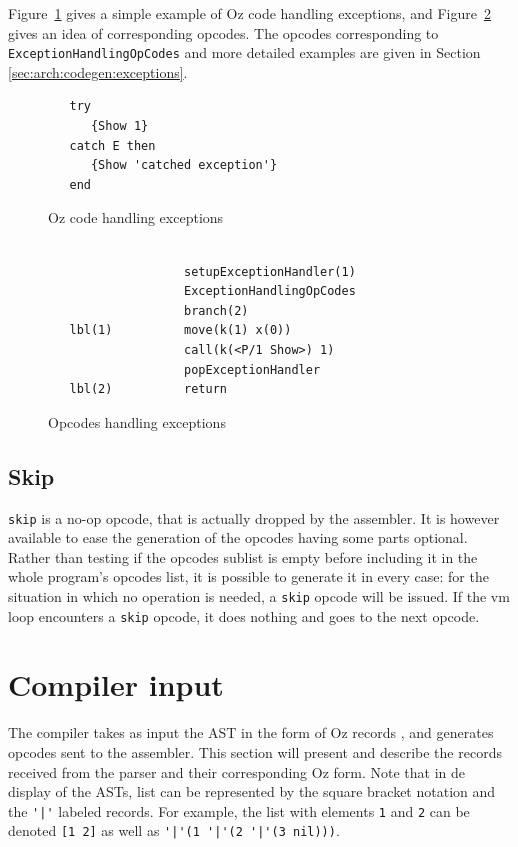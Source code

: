 \documentclass[a4paper]{memoir}
\begin{document}
Figure~\ref{fig:opcodes:exception:oz} gives a simple example of Oz code
handling exceptions, and Figure~\ref{fig:opcodes:exception:result} gives an
idea of corresponding opcodes. The opcodes corresponding to
\lstinline!ExceptionHandlingOpCodes! and more detailed examples are given in
Section \ref{sec:arch:codegen:exceptions}.
\begin{figure}[ht]
\begin{lstlisting}
   try
      {Show 1}
   catch E then
      {Show 'catched exception'}
   end
\end{lstlisting}
\caption{Oz code handling exceptions}
\label{fig:opcodes:exception:oz}
\end{figure}



\begin{figure}[ht]
\begin{lstlisting}
    
                   setupExceptionHandler(1)
                   ExceptionHandlingOpCodes
                   branch(2)
   lbl(1)          move(k(1) x(0))
                   call(k(<P/1 Show>) 1)
                   popExceptionHandler
   lbl(2)          return
\end{lstlisting}
\caption{Opcodes handling exceptions}
\label{fig:opcodes:exception:result}
\end{figure}


\subsection{Skip}
\lstinline!skip! is a no-op opcode, that is actually dropped by the assembler.
It is however available to ease the generation of the opcodes having some parts
optional. Rather than testing if the opcodes sublist is empty before including
it in the whole program's opcodes list, it is possible to generate it in every
case: for the situation in which no operation is needed, a \lstinline!skip! opcode will be
issued.
If the vm loop encounters a \lstinline!skip! opcode, it does nothing and goes to the next opcode.






\section{Compiler input}\label{section:compilerinput}
The compiler takes as input the AST in the form of Oz records \cite{AST}, and generates opcodes sent to the assembler. 
This section will present and describe the records received from the parser and
their corresponding Oz form. Note that in de display of the ASTs, list can be represented by the square bracket notation and the \lstinline!'|'! labeled records.
For example, the list with elements \lstinline!1! and \lstinline!2! can be denoted \lstinline![1 2]! as well as \lstinline!'|'(1 '|'(2 '|'(3 nil)))!.
\end{document}
